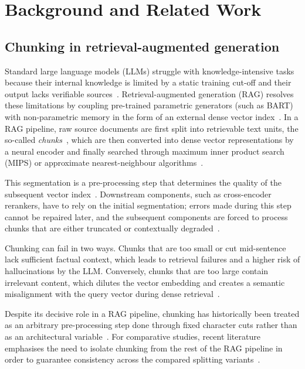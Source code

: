\chapter{Background and Related Work}
\label{ch:background}

\section{Chunking in retrieval-augmented generation}
\label{sec:rag_chunking}

Standard large language models (LLMs) struggle with knowledge-intensive tasks because their
internal knowledge is limited by a static training cut-off and their output lacks
verifiable sources~\cite{lewis2020rag}. Retrieval-augmented generation (RAG) resolves these
limitations by coupling pre-trained parametric generators (such as BART) with
non-parametric memory in the form of an external dense vector index~\cite{lewis2020rag}. In
a RAG pipeline, raw source documents are first split into retrievable text units, the
so-called \emph{chunks}~\cite{smigielski2026chunking}, which are then converted into dense
vector representations by a neural encoder and finally searched through maximum inner
product search (MIPS) or approximate nearest-neighbour algorithms~\cite{lewis2020rag}.

This segmentation is a pre-processing step that determines the quality of the subsequent
vector index~\cite{smigielski2026chunking}. Downstream components, such as cross-encoder
rerankers, have to rely on the initial segmentation; errors made during this step cannot be
repaired later, and the subsequent components are forced to process chunks that are either
truncated or contextually degraded~\cite{duarte2024lumberchunker}.

Chunking can fail in two ways. Chunks that are too small or cut mid-sentence lack
sufficient factual context, which leads to retrieval failures and a higher risk of
hallucinations by the LLM. Conversely, chunks that are too large contain irrelevant
content, which dilutes the vector embedding and creates a semantic misalignment with the
query vector during dense retrieval~\cite{smigielski2026chunking}.

Despite its decisive role in a RAG pipeline, chunking has historically been treated as an
arbitrary pre-processing step done through fixed character cuts rather than as an
architectural variable~\cite{qu-etal-2025-semantic}. For comparative studies, recent
literature emphasises the need to isolate chunking from the rest of the RAG pipeline in
order to guarantee consistency across the compared splitting
variants~\cite{smigielski2026chunking}.

